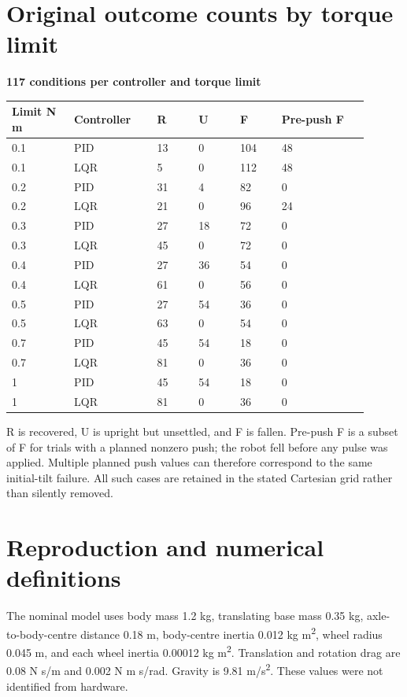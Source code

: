 \documentclass[11pt,a4paper]{article}
\begin{document}
\section*{Original outcome counts by torque limit}
\textbf{117 conditions per controller and torque limit}
\begin{longtable}{p{0.153\linewidth}p{0.207\linewidth}p{0.108\linewidth}p{0.108\linewidth}p{0.108\linewidth}p{0.216\linewidth}}
\toprule
Limit N m & Controller & R & U & F & Pre-push F \\ \midrule \endhead
0.1 & PID & 13 & 0 & 104 & 48 \\
0.1 & LQR & 5 & 0 & 112 & 48 \\
0.2 & PID & 31 & 4 & 82 & 0 \\
0.2 & LQR & 21 & 0 & 96 & 24 \\
0.3 & PID & 27 & 18 & 72 & 0 \\
0.3 & LQR & 45 & 0 & 72 & 0 \\
0.4 & PID & 27 & 36 & 54 & 0 \\
0.4 & LQR & 61 & 0 & 56 & 0 \\
0.5 & PID & 27 & 54 & 36 & 0 \\
0.5 & LQR & 63 & 0 & 54 & 0 \\
0.7 & PID & 45 & 54 & 18 & 0 \\
0.7 & LQR & 81 & 0 & 36 & 0 \\
1 & PID & 45 & 54 & 18 & 0 \\
1 & LQR & 81 & 0 & 36 & 0 \\
\bottomrule
\end{longtable}
R is recovered, U is upright but unsettled, and F is fallen. Pre-push F is a subset of F for trials with a planned nonzero push; the robot fell before any pulse was applied. Multiple planned push values can therefore correspond to the same initial-tilt failure. All such cases are retained in the stated Cartesian grid rather than silently removed.

\clearpage
\section*{Reproduction and numerical definitions}
The nominal model uses body mass 1.2 kg, translating base mass 0.35 kg, axle-to-body-centre distance 0.18 m, body-centre inertia 0.012 kg m\textsuperscript{2}, wheel radius 0.045 m, and each wheel inertia 0.00012 kg m\textsuperscript{2}. Translation and rotation drag are 0.08 N s/m and 0.002 N m s/rad. Gravity is 9.81 m/s\textsuperscript{2}. These values were not identified from hardware.
\end{document}
